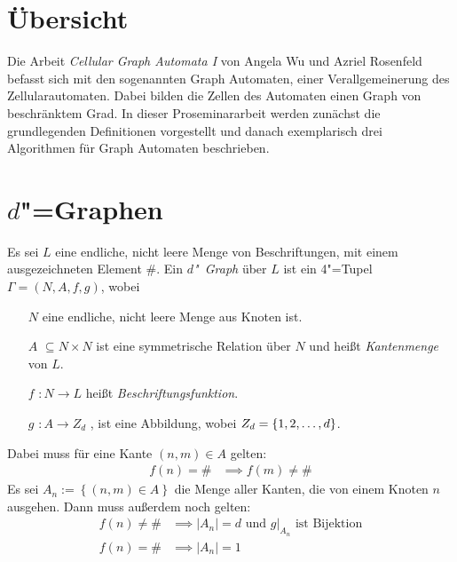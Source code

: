 \documentclass[11pt]{article}
\newcommand{\defWord}[1]{\emph{#1}}
\begin{document}
\clearpage

\section{Übersicht}
Die Arbeit \emph{Cellular Graph Automata I} von Angela Wu und Azriel Rosenfeld befasst sich mit den sogenannten Graph Automaten, einer Verallgemeinerung des Zellularautomaten. Dabei bilden die Zellen des Automaten einen Graph von beschränktem Grad. In dieser Proseminararbeit werden zunächst die grundlegenden Definitionen vorgestellt und danach exemplarisch drei Algorithmen für Graph Automaten beschrieben.

\section{$d$"=Graphen}
\begin{definition}[$d$"~Graph]
Es sei $L$ eine endliche, nicht leere Menge von Beschriftungen, mit einem ausgezeichneten Element $\#$. 
Ein \defWord{$d$"~Graph} über $L$ ist ein 4"=Tupel $\Gamma = \left(N, A, f, g\right)$, wobei
\begin{itemize}
	\item[$N$] eine endliche, nicht leere Menge aus Knoten ist.
	\item[$A$] $\subseteq N \times N$ ist eine symmetrische Relation über $N$ und heißt \defWord{Kantenmenge} von $L$.
	\item[$f$] $: N \rightarrow L$  heißt \defWord{Beschriftungsfunktion}.
	\item[$g$] $: A \rightarrow Z_d$ , ist eine Abbildung, wobei $Z_d = \left \{1, 2,\text{\dots}, d \right \}$. 
\end{itemize}
Dabei muss für eine Kante $\left(n, m\right) \in A$ gelten:
\begin{align*}
f(n) = \# &\implies f(m) \neq \#
\end{align*}
Es sei $A_n := \left \{\left(n, m\right) \in A\right \}$ die Menge aller Kanten, die von einem Knoten $n$ ausgehen. Dann muss außerdem noch gelten:
\begin{align*}
f(n) \neq \# &\implies  \left|A_n\right| = d \text{ und } g \vert_{A_n} \text{ ist Bijektion} \\
f(n) = \# &\implies\left|A_n\right| = 1
\end{align*}

\end{definition}
\end{document}

